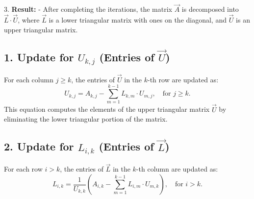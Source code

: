 \documentclass[journal]{IEEEtran}
\begin{document}
3. \textbf{Result:}  
   - After completing the iterations, the matrix $\vec{A}$ is decomposed into $\vec{L} \cdot \vec{U}$, where $\vec{L}$ is a lower triangular matrix with ones on the diagonal, and $\vec{U}$ is an upper triangular matrix.

\subsection*{1. Update for $U_{k,j}$ (Entries of $\vec{U}$)}
For each column $j \geq k$, the entries of $\vec{U}$ in the $k$-th row are updated as:
\[
U_{k,j} = A_{k,j} - \sum_{m=1}^{k-1} L_{k,m} \cdot U_{m,j}, \quad \text{for } j \geq k.
\]
This equation computes the elements of the upper triangular matrix $\vec{U}$ by eliminating the lower triangular portion of the matrix.

\subsection*{2. Update for $L_{i,k}$ (Entries of $\vec{L}$)}
For each row $i > k$, the entries of $\vec{L}$ in the $k$-th column are updated as:
\[
L_{i,k} = \frac{1}{U_{k,k}} \left( A_{i,k} - \sum_{m=1}^{k-1} L_{i,m} \cdot U_{m,k} \right), \quad \text{for } i > k.
\]
\end{document}
